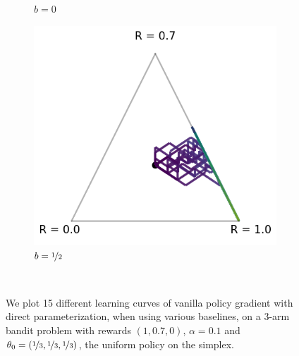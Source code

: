 \begin{figure}[!ht]
\begin{subfigure}[b]{0.3\linewidth}
    \caption{$b = 0$}
  \end{subfigure}
  \begin{subfigure}[b]{0.3\linewidth}
    \includegraphics[width=\textwidth]{articles/baselines/figs/appendix_figs_3arm_000/vanilla_fixed_05.png}
    \caption{$b = \nicefrac{1}{2}$}
  \end{subfigure}
  \caption{We plot 15 different learning curves of vanilla policy gradient with direct parameterization, when using various baselines, on a 3-arm bandit problem with rewards $(1, 0.7, 0)$, $\alpha = 0.1$ and $\theta_0 = (\nicefrac{1}{3}, \nicefrac{1}{3}, \nicefrac{1}{3})$, the uniform policy on the simplex.}~\label{appfig:learning_curves_dpg_035_simplex}
\end{figure}

